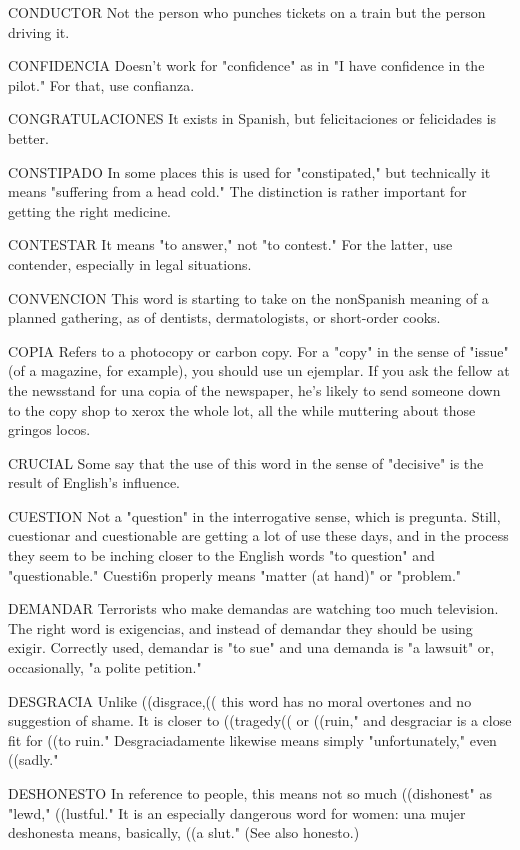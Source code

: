 CONDUCTOR Not the person who punches tickets on a train
but the person driving it.

CONFIDENCIA Doesn't work for "confidence" as in "I have
confidence in the pilot." For that, use confianza.

CONGRATULACIONES It exists in Spanish, but felicitaciones
or felicidades is better.

CONSTIPADO In some places this is used for "constipated,"
but technically it means "suffering from a head cold." The distinction
is rather important for getting the right medicine.

CONTESTAR It means "to answer," not "to contest." For the
latter, use contender, especially in legal situations.

CONVENCION This word is starting to take on the nonSpanish meaning of a planned gathering, as of dentists, dermatologists, or short-order cooks.

COPIA Refers to a photocopy or carbon copy. For a "copy" in
the sense of "issue" (of a magazine, for example), you should use un
ejemplar. If you ask the fellow at the newsstand for una copia of the
newspaper, he's likely to send someone down to the copy shop to
xerox the whole lot, all the while muttering about those gringos
locos.

CRUCIAL Some say that the use of this word in the sense of
"decisive" is the result of English's influence.

CUESTION Not a "question" in the interrogative sense,
which is pregunta. Still, cuestionar and cuestionable are getting a
lot of use these days, and in the process they seem to be inching closer
to the English words "to question" and "questionable." Cuesti6n properly means "matter (at hand)" or "problem."

DEMANDAR Terrorists who make demandas are watching
too much television. The right word is exigencias, and instead of
demandar they should be using exigir. Correctly used, demandar is
"to sue" and una demanda is "a lawsuit" or, occasionally, "a polite
petition."

DESGRACIA Unlike ((disgrace,(( this word has no moral overtones and no suggestion of shame. It is closer to ((tragedy(( or ((ruin,"
and desgraciar is a close fit for ((to ruin." Desgraciadamente likewise
means simply "unfortunately," even ((sadly."

DESHONESTO In reference to people, this means not so
much ((dishonest" as "lewd," ((lustful." It is an especially dangerous
word for women: una mujer deshonesta means, basically, ((a slut."
(See also honesto.)

